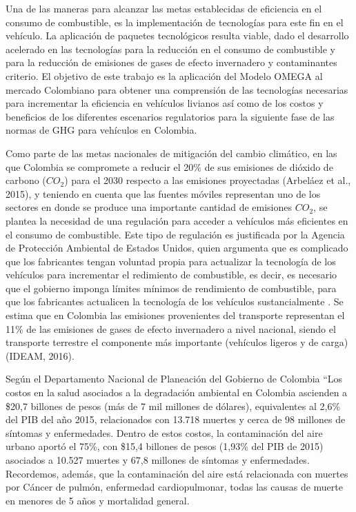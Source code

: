 Una de las maneras para alcanzar las metas establecidas de eficiencia en el consumo de combustible, es la implementación de tecnologías para este fin en el vehículo. La aplicación de paquetes tecnológicos resulta viable, dado el desarrollo acelerado en las tecnologías para la reducción en el consumo de combustible y para la reducción de emisiones de gases de efecto invernadero y contaminantes criterio. El objetivo de este trabajo es la aplicación del Modelo OMEGA al mercado Colombiano para obtener una comprensión de las tecnologías necesarias para incrementar la eficiencia en vehículos livianos así como de los costos y beneficios de los diferentes escenarios regulatorios para la siguiente fase de las normas de GHG para vehículos en Colombia.

Como parte de las metas nacionales de mitigación del cambio climático, en las que Colombia se compromete a reducir el 20\% de sus emisiones de dióxido de carbono ($CO_2$) para el 2030 respecto a las emisiones proyectadas (Arbeláez et al., 2015), y teniendo en cuenta que las fuentes móviles representan uno de los sectores en donde se produce una importante cantidad de emisiones $CO_2$, se plantea la necesidad de una regulación para acceder a vehículos más eficientes en el consumo de combustible. Este tipo de regulación es justificada por la Agencia de Protección Ambiental de Estados Unidos, quien argumenta que es complicado que los fabricantes tengan voluntad propia para actualizar la tecnología de los vehículos para incrementar el redimiento de combustible, es decir, es necesario que el gobierno imponga límites mínimos de rendimiento de combustible, para que los fabricantes actualicen la tecnología de los vehículos sustancialmente \cite{EPA_2012-A}. Se estima que en Colombia las emisiones provenientes del transporte representan el 11\% de las emisiones de gases de efecto invernadero a nivel nacional, siendo el transporte terrestre el componente más importante (vehículos ligeros y de carga) (IDEAM, 2016). \label{Informe Final}

Según el Departamento Nacional de Planeación del Gobierno de Colombia “Los costos en la salud asociados a la degradación ambiental en Colombia ascienden a \$20,7 billones de pesos (más de 7 mil millones de dólares), equivalentes al 2,6\% del PIB del año 2015, relacionados con 13.718 muertes y cerca de 98 millones de síntomas y enfermedades. Dentro de estos costos, la contaminación del aire urbano aportó el 75\%, con \$15,4 billones de pesos (1,93\% del PIB de 2015) asociados a 10.527 muertes y 67,8 millones de síntomas y enfermedades. Recordemos, además, que la contaminación del aire está relacionada con muertes por Cáncer de pulmón, enfermedad cardiopulmonar, todas las causas de muerte en menores de 5 años y mortalidad general. 


